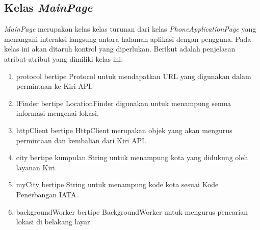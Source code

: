 \subsection{Kelas \textit{MainPage}}
\label{lab:Kelas MainPage}
\hspace{0.5cm} \textit{MainPage} merupakan kelas kelas turunan dari kelas \textit{PhoneApplicationPage} yang menangani interaksi langsung antara halaman aplikasi dengan pengguna. Pada kelas ini akan ditaruh kontrol yang diperlukan. Berikut adalah penjelasan atribut-atribut yang dimiliki kelas ini:
\begin{enumerate}
	\item protocol bertipe Protocol untuk mendapatkan URL yang digunakan dalam permintaan ke Kiri API.
	\item lFinder bertipe LocationFinder digunakan untuk menampung semua informasi mengenai lokasi.
	\item httpClient bertipe HttpClient merupakan objek yang akan mengurus permintaan dan kembalian dari Kiri API.
	\item city bertipe kumpulan String untuk menampung kota yang didukung oleh layanan Kiri.
	\item myCity bertipe String untuk menampung kode kota sesuai Kode Penerbangan IATA.
	\item backgroundWorker bertipe BackgroundWorker untuk mengurus pencarian lokasi di belakang layar.
\end{enumerate}

